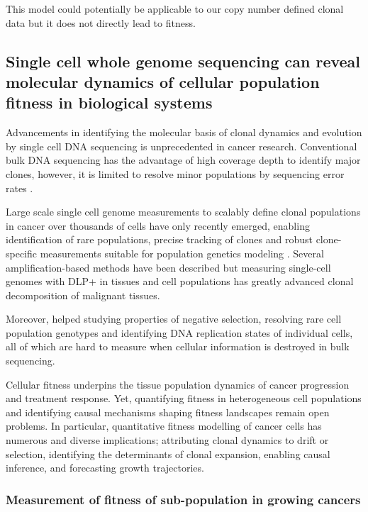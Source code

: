 This model could potentially be applicable to our copy number defined clonal data but it does not directly lead to fitness.



\subsection{Single cell whole genome sequencing can reveal molecular dynamics of cellular population fitness in biological systems}
Advancements in identifying the molecular basis of clonal dynamics and evolution by single cell DNA sequencing is unprecedented in cancer research. Conventional bulk DNA sequencing has the advantage of high coverage depth to identify major clones, however, it is limited to resolve minor populations by sequencing error rates \cite{gerstung2012reliable}. 

Large scale single cell genome measurements to scalably define clonal populations in cancer over thousands of cells have only recently emerged, enabling identification of rare populations, precise tracking of clones and robust clone-specific measurements suitable for population genetics modeling  \cite{laks2019clonal,zahn2017scalable}. Several amplification-based methods have been described \cite{navin2011tumour,zong2012genome, hou2012single,ni2013reproducible} but measuring single-cell genomes with \ac{DLP+} in tissues and cell populations has greatly advanced clonal decomposition of malignant tissues. 

Moreover, helped studying properties of negative selection, resolving rare cell population genotypes and identifying DNA replication states of individual cells, all of which are hard to measure when cellular information is destroyed in bulk sequencing. 

Cellular fitness underpins the tissue population dynamics of cancer progression and treatment response. Yet, quantifying fitness in heterogeneous cell populations and identifying causal mechanisms shaping fitness landscapes remain open problems. In particular, quantitative fitness modelling of cancer cells has numerous and diverse implications; attributing clonal dynamics to drift or selection, identifying the determinants of clonal expansion, enabling causal inference, and forecasting growth trajectories. 

\subsubsection{Measurement of fitness of sub-population in growing cancers}

